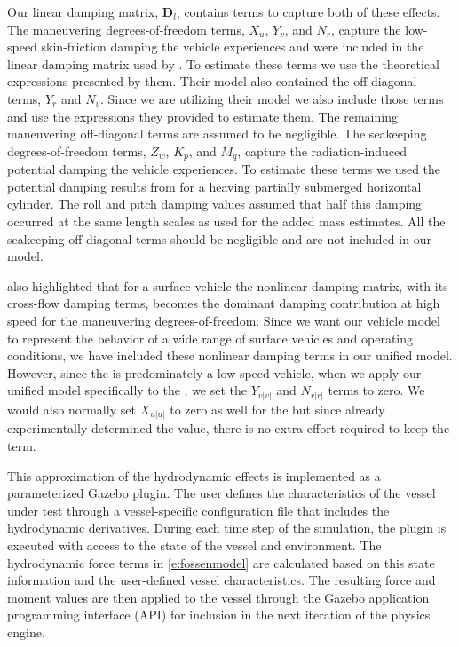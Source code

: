\documentclass[utf8]{frontiersSCNS} %
\begin{document}
Our linear damping matrix, $\bm{D}_l$, contains terms to capture both of these effects. The maneuvering degrees-of-freedom terms, $X_{u}$, $Y_{v}$, and $N_{r}$, capture the low-speed skin-friction damping the vehicle experiences and were included in the linear damping matrix used by \citet{sarda16station}. To estimate these terms we use the theoretical expressions presented by them. Their model also contained the off-diagonal terms, $Y_{r}$ and $N_{v}$. Since we are utilizing their model we also include those terms and use the expressions they provided to estimate them. The remaining maneuvering off-diagonal terms are assumed to be negligible. The seakeeping degrees-of-freedom terms, $Z_{w}$, $K_{p}$, and $M_{q}$, capture the radiation-induced potential damping the vehicle experiences. To estimate these terms we used the potential damping results from \citet{greenhow88added} for a heaving partially submerged horizontal cylinder. The roll and pitch damping values assumed that half this damping occurred at the same length scales as used for the added mass estimates. All the seakeeping off-diagonal terms should be negligible and are not included in our model.

\citet{fossen11handbook} also highlighted that for a surface vehicle the nonlinear damping matrix, with its cross-flow damping terms, becomes the dominant damping contribution at high speed for the maneuvering degrees-of-freedom. Since we want our vehicle model to represent the behavior of a wide range of surface vehicles and operating conditions, we have included these nonlinear damping terms in our unified model. However, since the \wamv{} is predominately a low speed vehicle, when we apply our unified model specifically to the \wamv{}, we set the $Y_{v|v|}$ and $N_{r|r|}$ terms to zero. We would also normally set $X_{u|u|}$ to zero as well for the \wamv{} but since \citet{sarda16station} already experimentally determined the value, there is no extra effort required to keep the term.

This approximation of the hydrodynamic effects is implemented as a parameterized Gazebo plugin. The user defines the characteristics of the vessel under test through a vessel-specific configuration file that includes the hydrodynamic derivatives. During each time step of the simulation, the plugin is executed with access to the state of the vessel and environment. The hydrodynamic force terms in \eqref{e:fossenmodel} are calculated based on this state information and the user-defined vessel characteristics. The resulting force and moment values are then applied to the vessel through the Gazebo application programming interface (API) for inclusion in the next iteration of the physics engine.
\end{document}
